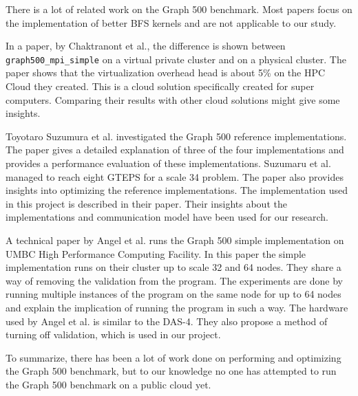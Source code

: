 There is a lot of related work on the Graph 500 benchmark. Most papers focus on the implementation of better BFS kernels and are not applicable to our study.

In a paper, by Chaktranont et al.\cite{chakthranont2014exploring}, the difference is shown between \texttt{graph500\_mpi\_simple} on a virtual private cluster and on a physical cluster. The paper shows that the  virtualization overhead head is about 5\% on the HPC Cloud they created. This is a cloud solution specifically created for super computers. Comparing their results with other cloud solutions might give some insights.

Toyotaro Suzumura et al. \cite{suzumura2011performance} investigated the Graph 500 reference implementations. The paper gives a detailed explanation of three of the four implementations and provides a performance evaluation of these implementations. Suzumaru et al. managed to reach eight GTEPS for a scale 34 problem. The paper also provides insights into optimizing the reference implementations. The implementation used in this project is described in their paper. Their insights about the implementations and communication model have been used for our research.

A technical paper by Angel et al.\cite{angel2012graph} runs the Graph 500 simple implementation on UMBC High Performance Computing Facility. In this paper the simple implementation runs on their cluster up to scale 32 and 64 nodes. They share a way of removing the validation from the program. The experiments are done by running multiple instances of the program on the same node for up to 64 nodes and explain the implication of running the program in such a way. The hardware used by Angel et al. is similar to the DAS-4. They also propose a method of turning off validation, which is used in our project.

To summarize, there has been a lot of work done on performing and optimizing the Graph 500 benchmark, but to our knowledge no one has attempted to run the Graph 500 benchmark on a public cloud yet.